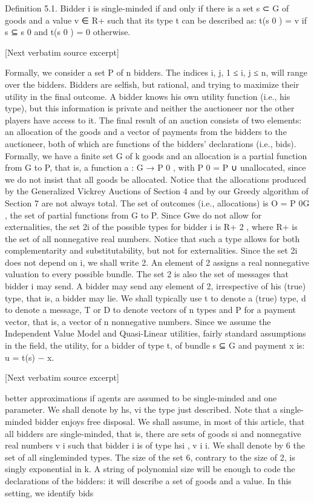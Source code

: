 \documentclass[10pt]{article}
\begin{document}
\begin{ReviewVerbatim}
Definition 5.1. Bidder i is single-minded if and only if there is a set s ⊂ G of
goods and a value v ∈ R+ such that its type t can be described as: t(s 0 ) = v if s ⊆ s 0
and t(s 0 ) = 0 otherwise.

[Next verbatim source excerpt]

Formally, we consider a set P of n bidders. The indices i, j, 1 ≤ i, j ≤ n, will
range over the bidders. Bidders are selfish, but rational, and trying to maximize their
utility in the final outcome. A bidder knows his own utility function (i.e., his type),
but this information is private and neither the auctioneer nor the other players have
access to it. The final result of an auction consists of two elements: an allocation
of the goods and a vector of payments from the bidders to the auctioneer, both of
which are functions of the bidders’ declarations (i.e., bids). Formally, we have a
finite set G of k goods and an allocation is a partial function from G to P, that is, a
function a : G → P 0 , with P 0 = P ∪ {unallocated}, since we do not insist that all
goods be allocated. Notice that the allocations produced by the Generalized Vickrey
Auctions of Section 4 and by our Greedy algorithm of Section 7 are not always
total. The set of outcomes (i.e., allocations) is O = P 0G , the set of partial functions
from G to P. Since Gwe do not allow for externalities, the set 2i of the possible types
for bidder i is R+ 2 , where R+ is the set of all nonnegative real numbers. Notice
that such a type allows for both complementarity and substitutability, but not for
externalities. Since the set 2i does not depend on i, we shall write 2. An element
of 2 assigns a real nonnegative valuation to every possible bundle. The set 2 is
also the set of messages that bidder i may send. A bidder may send any element of
2, irrespective of his (true) type, that is, a bidder may lie. We shall typically use t
to denote a (true) type, d to denote a message, T or D to denote vectors of n types
and P for a payment vector, that is, a vector of n nonnegative numbers.
Since we assume the Independent Value Model and Quasi-Linear utilities, fairly
standard assumptions in the field, the utility, for a bidder of type t, of bundle s ⊆ G
and payment x is:
u = t(s) − x.

[Next verbatim source excerpt]

better approximations if agents are assumed to be single-minded and one parameter. We shall denote by hs, vi the type just described. Note that a single-minded
bidder enjoys free disposal. We shall assume, in most of this article, that all bidders
are single-minded, that is, there are sets of goods si and nonnegative real numbers
v i such that bidder i is of type hsi , v i i. We shall denote by 6 the set of all singleminded types. The size of the set 6, contrary to the size of 2, is singly exponential
in k. A string of polynomial size will be enough to code the declarations of the
bidders: it will describe a set of goods and a value. In this setting, we identify bids


\end{ReviewVerbatim}
\end{document}
